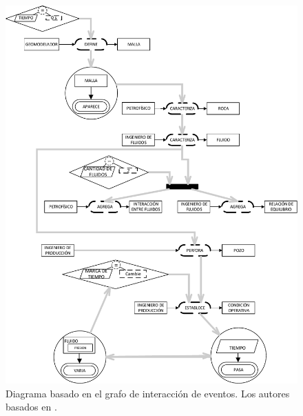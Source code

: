 \begin{figure}[h]
	\centering%
	\includegraphics[width=0.9\linewidth]{Fig/FlujoDeEventos.pdf}%
	\caption[Diagrama basado en el grafo de interacción de eventos.]{Diagrama basado en el grafo de interacción de eventos. Los autores basados en \cite{zapata2013Eventos}.} \label{fig:EventsInteraction}
\end{figure}

